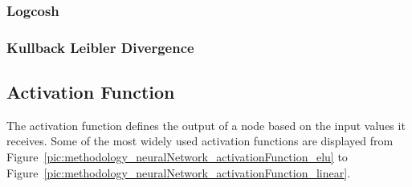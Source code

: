 \subsubsection{Logcosh}

\subsubsection{Kullback Leibler Divergence}

\subsection{Activation Function}
The activation function defines the output of a node based on the input values it receives. Some of the most widely used activation functions are displayed from Figure~\ref{pic:methodology_neuralNetwork_activationFunction_elu} to Figure~\ref{pic:methodology_neuralNetwork_activationFunction_linear}.

